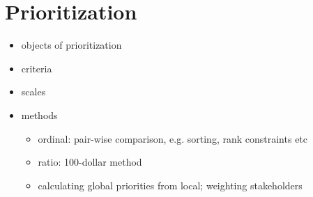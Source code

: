 
\chapter{Prioritization}

\begin{itemize}
  \item objects of prioritization
  \item criteria
  \item scales
  \item methods
  \begin{itemize}
    \item ordinal: pair-wise comparison, e.g. sorting, rank constraints etc
    \item ratio: 100-dollar method
    \item calculating global priorities from local; weighting stakeholders
  \end{itemize}
\end{itemize}
